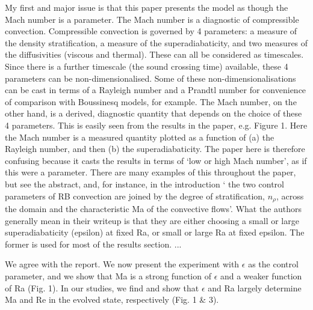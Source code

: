 \documentclass[aps, 11pt, singlecolumn]{revtex4-1} %
\begin{document}
\begin{singlespace}
\begin{myquotation}
My first and major issue is that this paper presents the model as
though the Mach number is a parameter. The Mach number is a diagnostic
of compressible convection. Compressible convection is governed by 4
parameters: a measure of the density stratification, a measure of the
superadiabaticity, and two measures of the diffusivities (viscous and
thermal). These can all be considered as timescales. Since there is a
further timescale (the sound crossing time) available, these 4
parameters can be non-dimensionalised. Some of these
non-dimensionalisations can be cast in terms of a Rayleigh number and
a Prandtl number for convenience of comparison with Boussinesq models,
for example. The Mach number, on the other hand, is a derived,
diagnostic quantity that depends on the choice of these 4 parameters.
This is easily seen from the results in the paper, e.g. Figure 1. Here
the Mach number is a measured quantity plotted as a function of (a)
the Rayleigh number, and then (b) the superadiabaticity. The paper
here is therefore confusing because it casts the results in terms of
`low or high Mach number', as if this were a parameter. There
are many examples of this throughout the paper, but see the abstract,
and, for instance, in the introduction ` the two control parameters
of RB convection are joined by the degree of stratification, $n_\rho$,
across the domain and the characteristic Ma of the convective
flows'. What the authors generally mean in their writeup is that
they are either choosing a small or large superadiabaticity (epsilon)
at fixed Ra, or small or large Ra at fixed epsilon. The former is used
for most of the results section.  ...
\end{myquotation}
We agree with the report. We now present the experiment with $\epsilon$
as the control parameter, and we show that Ma is a strong function of
$\epsilon$ and a weaker function of Ra (Fig. 1).  In our studies, we
find and show that $\epsilon$ and Ra largely determine Ma and Re in the
evolved state, respectively (Fig. 1 \& 3).


\end{singlespace}
\end{document}
